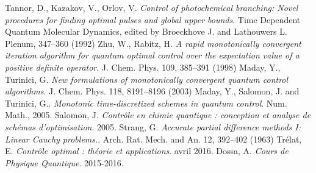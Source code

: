 

\begin{thebibliography}{KNU90}
 Tannor, D., Kazakov, V., Orlov, V.
\emph{Control of photochemical branching: Novel procedures for finding optimal pulses and global upper bounds}. Time Dependent Quantum Molecular Dynamics, edited by Broeckhove J. and Lathouwers L. Plenum, 347–360 (1992)
\vspace{0.5cm}
 Zhu, W., Rabitz, H.
\emph{A rapid monotonically convergent iteration algorithm for quantum optimal control over the expectation value of a positive definite operator}. J. Chem. Phys. 109, 385–391 (1998)
\vspace{0.5cm}
 Maday, Y., Turinici, G. 
\emph{New formulations of monotonically convergent quantum control algorithms}. J. Chem. Phys. 118, 8191–8196 (2003)
\vspace{0.5cm}
 Maday, Y., Salomon, J. and Turinici, G..
\emph{Monotonic time-discretized schemes in quantum control}. Num. Math., 2005.
\vspace{0.5cm}
 Salomon, J.
\emph{Contrôle en chimie quantique : conception et analyse de schémas d’optimisation}. 2005.
\vspace{0.5cm}
 Strang, G. 
\emph{Accurate partial difference methods I: Linear Cauchy problems.}. Arch. Rat. Mech. and An. 12, 392–402 (1963)
\vspace{0.5cm}
 Trélat, E.
\emph{Contrôle optimal : théorie et applications}. avril 2016.
\vspace{0.5cm}
 Dossa, A.
\emph{Cours de Physique Quantique}. 2015-2016.
\end{thebibliography}